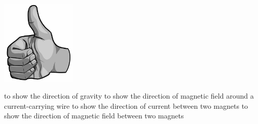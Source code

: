 \documentclass{exam}
\begin{document}
\begin{questions}
\begin{center}
\begin{minipage}{0.3\textwidth}
\centering
\end{minipage}%
\hspace{1em}
\begin{minipage}{0.3\textwidth}
    \centering
        \includegraphics[width=3.6cm]{Figures/Unit10_RightHandRule.jpeg}
\end{minipage}
\end{center}

\begin{randomizechoices}
\choice to show the direction of gravity
\CorrectChoice to show the direction of magnetic field around a current-carrying wire
\choice to show the direction of current between two magnets
\choice to show the direction of magnetic field between two magnets
\end{randomizechoices}





\end{questions}
\end{document}
